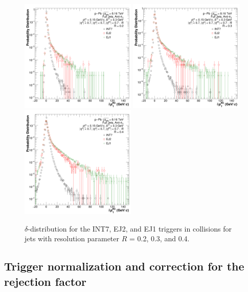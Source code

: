 \begin{figure}[hbt!]
  \centering
  \includegraphics[width=0.49\textwidth]{figures/pPbFigures/BGSubtraction/plotDpT_R02.png}
  \includegraphics[width=0.49\textwidth]{figures/pPbFigures/BGSubtraction/plotDpT_R03.png}
  \includegraphics[width=0.49\textwidth]{figures/pPbFigures/BGSubtraction/plotDpT_R04.png}
  \caption{$\delta$-\pT distribution for the INT7, EJ2, and EJ1 triggers in \pPb collisions for jets with resolution parameter $R$ = 0.2, 0.3, and 0.4.}
  \label{fig:DeltaPt_distribution}
\end{figure}

\subsection{Trigger normalization and correction for the rejection factor}
\label{sec:triggerCorrection}

